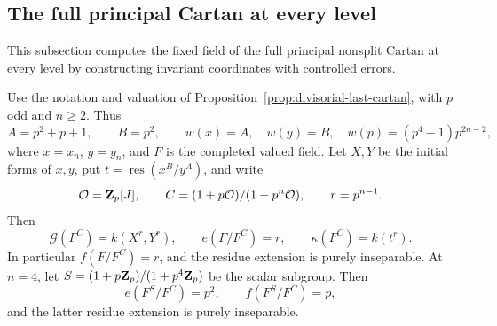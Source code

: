 \subsection{The full principal Cartan at every level}\label{sec:divisorial-full-cartan}
This subsection computes the fixed field of the full principal nonsplit Cartan at every level by constructing invariant coordinates with controlled errors.

\begin{proposition}\label{prop:divisorial-full-cartan}
Use the notation and valuation of Proposition~\ref{prop:divisorial-last-cartan}, with $p$ odd and $n\ge2$. Thus
\[
 A=p^2+p+1,\qquad B=p^2,\qquad
 w(x)=A,\quad w(y)=B,\quad
 w(p)=(p^4-1)p^{2n-2},
\]
where $x=x_n$, $y=y_n$, and $F$ is the completed valued field. Let $X,Y$ be the initial forms of $x,y$, put $t=\operatorname{res}(x^B/y^A)$, and write
\[
 \mathcal O=\mathbf Z_p[J],\qquad
 C=(1+p\mathcal O)/(1+p^n\mathcal O),\qquad r=p^{n-1}.
\]
Then
\begin{equation}\label{eq:full-cartan-field}
 \mathcal G(F^C)=k(X^r,Y^r),\qquad
 e(F/F^C)=r,\qquad \kappa(F^C)=k(t^r).
\end{equation}
In particular $f(F/F^C)=r$, and the residue extension is purely inseparable.
At $n=4$, let $S=(1+p\mathbf Z_p)/(1+p^4\mathbf Z_p)$ be the scalar subgroup. Then
\begin{equation}\label{eq:full-cartan-scalar-relative}
 e(F^S/F^C)=p^2,\qquad f(F^S/F^C)=p,
\end{equation}
and the latter residue extension is purely inseparable.
\end{proposition}

